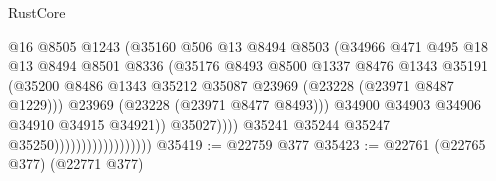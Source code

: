 \begin{lexlean}{RustCore}
\begin{coremodule}
                                                @16
                                                @8505
                                                @1243
                                                (@35160
                                                  @506
                                                  @13
                                                  @8494
                                                  @8503
                                                  (@34966
                                                    @471
                                                    @495
                                                    @18
                                                    @13
                                                    @8494
                                                    @8501
                                                    @8336
                                                    (@35176
                                                      @8493
                                                      @8500
                                                      @1337
                                                      @8476
                                                      @1343
                                                      @35191
                                                      (@35200
                                                        @8486
                                                        @1343
                                                        @35212
                                                        @35087
                                                        @23969
                                                        (@23228 (@23971 @8487 @1229)))
                                                      @23969
                                                      (@23228 (@23971 @8477 @8493)))
                                                    @34900
                                                    @34903
                                                    @34906
                                                    @34910
                                                    @34915
                                                    @34921))
                                                @35027))))
                                        @35241
                                        @35244
                                        @35247
                                        @35250))))))))))))))))))
@35419 := @22759 @377
@35423 := @22761 (@22765 @377) (@22771 @377)

\end{coremodule}
\end{lexlean}
